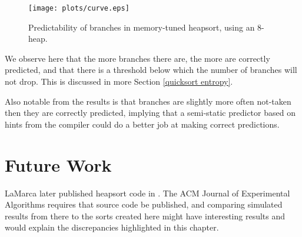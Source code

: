 \begin{figure}
\texttt{[image: plots/curve.eps]}
\caption{Predictability of branches in memory-tuned heapsort, using an 8-heap.}
\label{memory-tuned heapsort curve}
\end{figure}

\label{heapsort entropy}
We observe here that the more branches there are, the more are correctly
predicted, and that there is a threshold below which the number of branches will
not drop. This is discussed in more Section \ref{quicksort entropy}.

Also notable from the results is that branches are slightly more often not-taken
then they are correctly predicted, implying that a semi-static predictor based
on hints from the compiler could do a better job at making correct predictions.

\section{Future Work}

LaMarca later published heapsort code in \cite{LaMarcaHeap96}. The ACM
Journal of Experimental Algorithms requires that source code be published, and
comparing simulated results from there to the sorts created here might have
interesting results and would explain the discrepancies highlighted in this
chapter.
